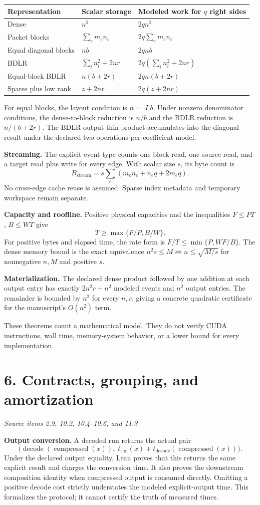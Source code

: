 \documentclass[11pt]{article}
\newcommand{\pageheading}[2]{\section*{\color{ink}#1}\textit{#2}\par}
\begin{document}
\begin{center}\small
\renewcommand{\arraystretch}{1.3}
\begin{tabular}{@{}lll@{}}
\toprule
Representation & Scalar storage & Modeled work for $q$ right sides\\
\midrule
Dense & $n^2$ & $2qn^2$\\
Packet blocks & $\sum_em_en_e$ & $2q\sum_em_en_e$\\
Equal diagonal blocks & $nb$ & $2qnb$\\
BDLR & $\sum_i n_i^2+2nr$ & $2q(\sum_i n_i^2+2nr)$\\
Equal-block BDLR & $n(b+2r)$ & $2qn(b+2r)$\\
Sparse plus low rank & $z+2nr$ & $2q(z+2nr)$\\
\bottomrule
\end{tabular}
\end{center}
For equal blocks, the layout condition is $n=|I|b$. Under nonzero denominator conditions, the dense-to-block reduction is $n/b$ and the BDLR reduction is $n/(b+2r)$. The BDLR output thin product accumulates into the diagonal result under the declared two-operations-per-coefficient model.

\textbf{Streaming.} The explicit event type counts one block read, one source read, and a target read plus write for every edge. With scalar size $s$, its byte count is
\[
B_{\mathrm{stream}}=s\sum_e(m_en_e+n_eq+2m_eq).
\]
No cross-edge cache reuse is assumed. Sparse index metadata and temporary workspace remain separate.

\textbf{Capacity and roofline.} Positive physical capacities and the inequalities $F\leq PT$, $B\leq WT$ give
\[
T\geq\max\{F/P,B/W\}.
\]
For positive bytes and elapsed time, the rate form is $F/T\leq\min\{P,WF/B\}$. The dense memory bound is the exact equivalence $n^2s\leq M\iff n\leq\sqrt{M/s}$ for nonnegative $n,M$ and positive $s$.

\textbf{Materialization.} The declared dense product followed by one addition at each output entry has exactly $2n^2r+n^2$ modeled events and $n^2$ output entries. The remainder is bounded by $n^2$ for every $n,r$, giving a concrete quadratic certificate for the manuscript's $O(n^2)$ term.

These theorems count a mathematical model. They do not verify CUDA instructions, wall time, memory-system behavior, or a lower bound for every implementation.

\newpage
\pageheading{6. Contracts, grouping, and amortization}{Source items 2.9, 10.2, 10.4--10.6, and 11.3}
\textbf{Output conversion.} A decoded run returns the actual pair
\[
\bigl(\operatorname{decode}(\operatorname{compressed}(x)),
\;t_{\mathrm{run}}(x)+t_{\mathrm{decode}}(\operatorname{compressed}(x))\bigr).
\]
Under the declared output equality, Lean proves that this returns the same explicit result and charges the conversion time. It also proves the downstream composition identity when compressed output is consumed directly. Omitting a positive decode cost strictly understates the modeled explicit-output time. This formalizes the protocol; it cannot certify the truth of measured times.
\end{document}
